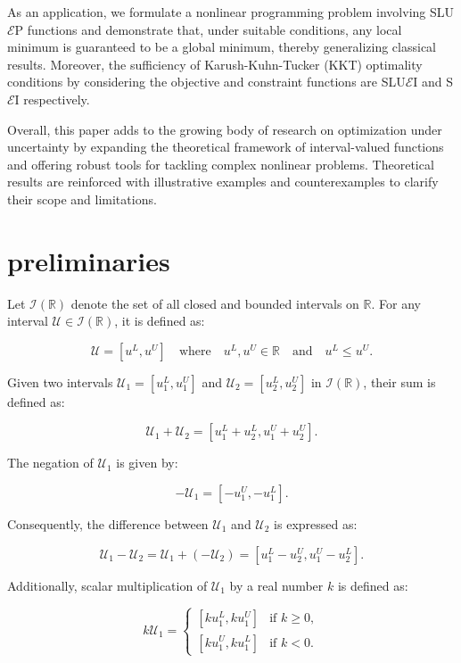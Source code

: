 \documentclass[12pt, reqno]{amsart}
\theoremstyle{definition}
\theoremstyle{remark}
\numberwithin{equation}{section}
\begin{document}
As an application, we formulate a nonlinear programming problem involving SLU$\mathcal{E}$P functions and demonstrate that, under suitable conditions, any local minimum is guaranteed to be a global minimum, thereby generalizing classical results. Moreover, the sufficiency of Karush-Kuhn-Tucker (KKT) optimality conditions by considering the objective and constraint functions are SLU$\mathcal{E}$I and S$\mathcal{E}$I respectively.

Overall, this paper adds to the growing body of research on optimization under uncertainty by expanding the theoretical framework of interval-valued functions and offering robust tools for tackling complex nonlinear problems. Theoretical results are reinforced with illustrative examples and counterexamples to clarify their scope and limitations.

  \section{\textbf{preliminaries}}
Let \( \mathcal{I}(\mathbb{R}) \) denote the set of all closed and bounded intervals on  \( \mathbb{R} \). For any interval \( \mathcal{U} \in \mathcal{I}(\mathbb{R}) \), it is defined as:

\[
\mathcal{U} = [u^L, u^U] \quad \text{where} \quad u^L, u^U \in \mathbb{R} \quad \text{and} \quad u^L \leq u^U.
\]

Given two intervals \( \mathcal{U}_1 = [u_1^L, u_1^U] \) and \( \mathcal{U}_2 = [u_2^L, u_2^U] \) in \( \mathcal{I}(\mathbb{R}) \), their sum is defined as:

\[
\mathcal{U}_1 + \mathcal{U}_2 = [u_1^L + u_2^L, u_1^U + u_2^U].
\]

The negation of \( \mathcal{U}_1 \) is given by:

\[
-\mathcal{U}_1 = [-u_1^U, -u_1^L].
\]

Consequently, the difference between \( \mathcal{U}_1 \) and \( \mathcal{U}_2 \) is expressed as:

\[
\mathcal{U}_1 - \mathcal{U}_2 = \mathcal{U}_1 + (-\mathcal{U}_2) = [u_1^L - u_2^U, u_1^U - u_2^L].
\]

Additionally, scalar multiplication of \( \mathcal{U}_1 \) by a real number \( k \) is defined as:

\[
k\mathcal{U}_1 = 
\begin{cases} 
[ku_1^L, ku_1^U] & \text{if } k \geq 0, \\
[ku_1^U, ku_1^L] & \text{if } k < 0.
\end{cases}
\]
\end{document}
